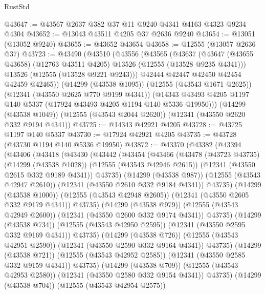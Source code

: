 \begin{lexlean}{RustStd}
\begin{coremodule}
@43647 := @43567 @2637 @382 @37 @11 @9240 @4341 @4163 @4323 @9234 @4304
@43652 := @13043 @43511 @4205 @37 @2636 @9240
@43654 := @13051 (@13052 @9240)
@43655 := @43652 @43654
@43658 := @12555 (@13057 @2636 @37)
@43723 := @43490
    (@43510
      (@43556
        (@43565
          (@43637
            (@43647 (@43655 @43658) (@12763 @43511 @4205) @13526 (@12555 (@13528 @9235 @4341)))
            @13526
            (@12555 (@13528 @9221 @9243)))
          @42444
          @42447
          @42450
          @42454
          @42459
          @42465))
      (@14299 (@43538 @1095))
      (@12555 (@43543 @1671 @2625))
      (@12341 (@43550 @2625 @770 @9199 @4341))
      (@14343 @43493 @4205 @1197 @140 @5337 (@17924 @43493 @4205 @1194 @140 @5336 @19950)))
    (@14299 (@43538 @1049))
    (@12555 (@43543 @2044 @2620))
    (@12341 (@43550 @2620 @332 @9194 @4341))
@43725 := @14343 @42921 @4205
@43728 := @43725 @1197 @140 @5337
@43730 := @17924 @42921 @4205
@43735 := @43728 (@43730 @1194 @140 @5336 @19950)
@43872 := @43370
    (@43382
      (@43394
        (@43406
          (@43418
            (@43430
              (@43442
                (@43454
                  (@43466
                    (@43478
                      (@43723 @43735)
                      (@14299 (@43538 @1028))
                      (@12555 (@43543 @42946 @2615))
                      (@12341 (@43550 @2615 @332 @9189 @4341))
                      @43735)
                    (@14299 (@43538 @987))
                    (@12555 (@43543 @42947 @2610))
                    (@12341 (@43550 @2610 @332 @9184 @4341))
                    @43735)
                  (@14299 (@43538 @1000))
                  (@12555 (@43543 @42948 @2605))
                  (@12341 (@43550 @2605 @332 @9179 @4341))
                  @43735)
                (@14299 (@43538 @979))
                (@12555 (@43543 @42949 @2600))
                (@12341 (@43550 @2600 @332 @9174 @4341))
                @43735)
              (@14299 (@43538 @734))
              (@12555 (@43543 @42950 @2595))
              (@12341 (@43550 @2595 @332 @9169 @4341))
              @43735)
            (@14299 (@43538 @726))
            (@12555 (@43543 @42951 @2590))
            (@12341 (@43550 @2590 @332 @9164 @4341))
            @43735)
          (@14299 (@43538 @721))
          (@12555 (@43543 @42952 @2585))
          (@12341 (@43550 @2585 @332 @9159 @4341))
          @43735)
        (@14299 (@43538 @709))
        (@12555 (@43543 @42953 @2580))
        (@12341 (@43550 @2580 @332 @9154 @4341))
        @43735)
      (@14299 (@43538 @704))
      (@12555 (@43543 @42954 @2575))

\end{coremodule}
\end{lexlean}
